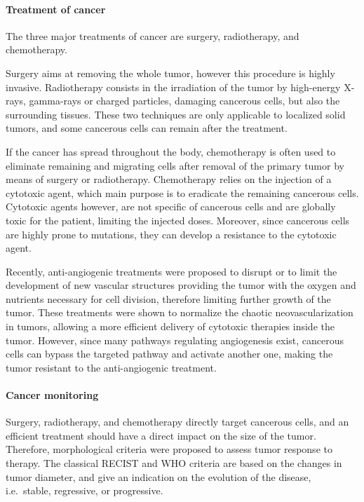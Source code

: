 \paragraph{Treatment of cancer}
\label{sec:IntroCancerTreatment}
The three major treatments of cancer are surgery, radiotherapy, and chemotherapy.

Surgery aims at removing the whole tumor, however this procedure is highly invasive.
Radiotherapy consists in the irradiation of the tumor by high-energy X-rays, gamma-rays or charged particles, damaging cancerous cells, but also the surrounding tissues. 
These two techniques are only applicable to localized solid tumors, and some cancerous cells can remain after the treatment.

If the cancer has spread throughout the body, chemotherapy is often used to eliminate remaining and migrating cells after removal of the primary tumor by means of surgery or radiotherapy.
Chemotherapy relies on the injection of a cytotoxic agent, which main purpose is to eradicate the remaining cancerous cells.
Cytotoxic agents however, are not specific of cancerous cells and are globally toxic for the patient, limiting the injected doses.
Moreover, since cancerous cells are highly prone to mutations, they can develop a resistance to the cytotoxic agent.

Recently, anti-angiogenic treatments were proposed to disrupt or to limit the development of new vascular structures providing the tumor with the oxygen and nutrients necessary for cell division, therefore limiting further growth of the tumor. 
These treatments were shown to normalize the chaotic neovascularization in tumors, allowing a more efficient delivery of cytotoxic therapies inside the tumor. %
However, since many pathways regulating angiogenesis exist, cancerous cells can bypass the targeted pathway and activate another one, making the tumor resistant to the anti-angiogenic treatment.

\paragraph{Cancer monitoring}
Surgery, radiotherapy, and chemotherapy directly target cancerous cells, and an efficient treatment should have a direct impact on the size of the tumor.
Therefore, morphological criteria were proposed to assess tumor response to therapy.
The classical RECIST and WHO criteria are based on the changes in tumor diameter, and give an indication on the evolution of the disease, i.e.~stable, regressive, or progressive.

